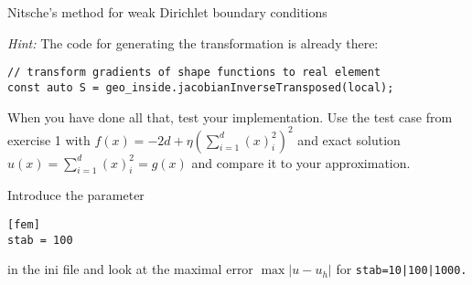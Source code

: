 \documentclass[12pt,a4paper]{article}
\begin{document}
\begin{Exercise}{Nitsche's method for weak Dirichlet boundary
    conditions}
\begin{itemize}
    \emph{Hint:} The code for generating the transformation
    is already there:
    \begin{lstlisting}
// transform gradients of shape functions to real element
const auto S = geo_inside.jacobianInverseTransposed(local);
    \end{lstlisting}

  \end{itemize}

  When you have done all that, test your implementation. Use the test
  case from exercise 1 with $f(x)=-2d+\eta(\sum_{i=1}^d(x)_i^2)^2$ and
  exact solution $u(x)=\sum_{i=1}^d(x)_i^2=g(x)$ and compare it to
  your approximation.

  Introduce the parameter
  \begin{lstlisting}
[fem]
stab = 100
  \end{lstlisting}
  in the ini file and look at the maximal error $\max|u-u_h|$ for
  \lstinline{stab=10|100|1000.}
\end{Exercise}
\end{document}
